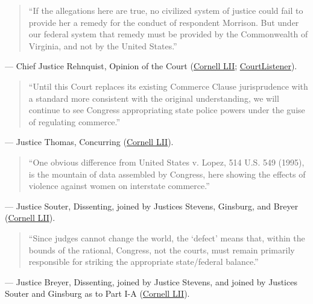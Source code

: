 \documentclass[12pt]{article}
\begin{document}
\begin{quote}
``If the allegations here are true, no civilized system of justice could fail to provide her a remedy for the conduct of respondent Morrison. But under our federal system that remedy must be provided by the Commonwealth of Virginia, and not by the United States.''
\end{quote}
\noindent --- Chief Justice Rehnquist, Opinion of the Court (\href{https://www.law.cornell.edu/supct/html/99-5.ZO.html}{Cornell LII}; \href{https://www.courtlistener.com/opinion/118363/united-states-v-morrison/}{CourtListener}).

\begin{quote}
``Until this Court replaces its existing Commerce Clause jurisprudence with a standard more consistent with the original understanding, we will continue to see Congress appropriating state police powers under the guise of regulating commerce.''
\end{quote}
\noindent --- Justice Thomas, Concurring (\href{https://www.law.cornell.edu/supct/html/99-5.ZC.html}{Cornell LII}).

\begin{quote}
``One obvious difference from United States v. Lopez, 514 U.S. 549 (1995), is the mountain of data assembled by Congress, here showing the effects of violence against women on interstate commerce.''
\end{quote}
\noindent --- Justice Souter, Dissenting, joined by Justices Stevens, Ginsburg, and Breyer (\href{https://www.law.cornell.edu/supct/html/99-5.ZD.html}{Cornell LII}).

\begin{quote}
``Since judges cannot change the world, the `defect' means that, within the bounds of the rational, Congress, not the courts, must remain primarily responsible for striking the appropriate state/federal balance.''
\end{quote}
\noindent --- Justice Breyer, Dissenting, joined by Justice Stevens, and joined by Justices Souter and Ginsburg as to Part I-A (\href{https://www.law.cornell.edu/supct/html/99-5.ZD1.html}{Cornell LII}).
\end{document}
